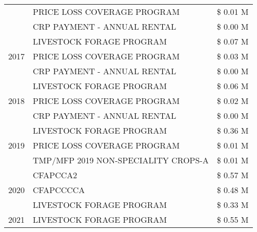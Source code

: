 \begin{tabular}{llr}
 & PRICE LOSS COVERAGE PROGRAM & \$ 0.01 M \\
 & CRP PAYMENT - ANNUAL RENTAL & \$ 0.00 M \\
\cline{1-3}
\multirow[t]{3}{*}{2017} & LIVESTOCK FORAGE PROGRAM & \$ 0.07 M \\
 & PRICE LOSS COVERAGE PROGRAM & \$ 0.03 M \\
 & CRP PAYMENT - ANNUAL RENTAL & \$ 0.00 M \\
\cline{1-3}
\multirow[t]{3}{*}{2018} & LIVESTOCK FORAGE PROGRAM & \$ 0.06 M \\
 & PRICE LOSS COVERAGE PROGRAM & \$ 0.02 M \\
 & CRP PAYMENT - ANNUAL RENTAL & \$ 0.00 M \\
\cline{1-3}
\multirow[t]{3}{*}{2019} & LIVESTOCK FORAGE PROGRAM & \$ 0.36 M \\
 & PRICE LOSS COVERAGE PROGRAM & \$ 0.01 M \\
 & TMP/MFP 2019 NON-SPECIALITY CROPS-A & \$ 0.01 M \\
\cline{1-3}
\multirow[t]{3}{*}{2020} & CFAPCCA2 & \$ 0.57 M \\
 & CFAPCCCCA & \$ 0.48 M \\
 & LIVESTOCK FORAGE PROGRAM & \$ 0.33 M \\
\cline{1-3}
2021 & LIVESTOCK FORAGE PROGRAM & \$ 0.55 M \\
\cline{1-3}
\bottomrule
\end{tabular}
